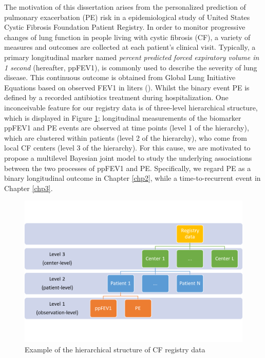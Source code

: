 The motivation of this dissertation arises from the personalized prediction of pulmonary exacerbation (PE) risk in a epidemiological study of United States Cystic Fibrosis Foundation Patient Registry. In order to monitor progressive changes of lung function in people living with cystic fibrosis (CF), a variety of measures and outcomes are collected at each patient’s clinical visit. Typically, a primary longitudinal marker named \emph{percent predicted forced expiratory volume in 1 second} (hereafter, ppFEV1), is commonly used to describe the severity of lung disease. This continuous outcome is obtained from Global Lung Initiative Equations based on observed FEV1 in liters (\cite{Quanjer2012}). Whilst the binary event PE is defined by a recorded antibiotics treatment during hospitalization. One inconceivable feature for our registry data is of three-level hierarchical structure, which is displayed in Figure \ref{chp1_hds}; longitudinal measurements of the biomarker ppFEV1 and PE events are observed at time points (level 1 of the hierarchy), which are clustered within patients (level 2 of the hierarchy), who come from local CF centers (level 3 of the hierarchy). For this cause, we are motivated to propose a multilevel Bayesian joint model to study the underlying associations between the two processes of ppFEV1 and PE. Specifically, we regard PE as a binary longitudinal outcome in Chapter \ref{chp2}, while a time-to-recurrent event in Chapter \ref{chp3}.   

\begin{figure}[H]
\centering
\includegraphics[width=\textwidth]{Figures/Chp1_HDS.png}
\caption{Example of the hierarchical structure of CF registry data}
\label{chp1_hds}
\end{figure}


